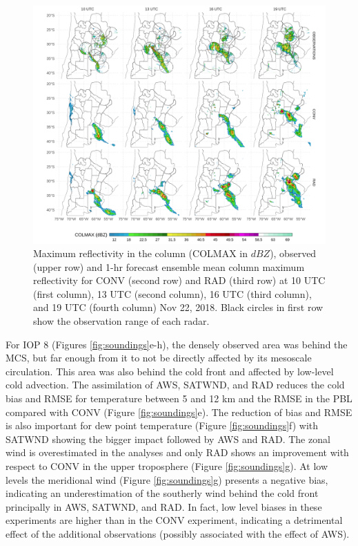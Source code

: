 \documentclass[final,5p,times,twocolumn,authoryear]{elsarticle} %
\begin{document}
\begin{figure}[h]
\includegraphics[width=1\linewidth]{../figures/dbz-mean-1} \caption{Maximum reflectivity in the column (COLMAX in \(dBZ\)), observed (upper row) and 1-hr forecast ensemble mean column maximum reflectivity for CONV (second row) and RAD (third row) at 10 UTC (first column), 13 UTC (second column), 16 UTC (third column), and 19 UTC (fourth column) Nov 22, 2018. Black circles in first row show the observation range of each radar.}\label{fig:dbz-mean}
\end{figure}

For IOP 8 (Figures \ref{fig:soundings}e-h), the densely observed area was behind the MCS, but far enough from it to not be directly affected by its mesoscale circulation. This area was also behind the cold front and affected by low-level cold advection. The assimilation of AWS, SATWND, and RAD reduces the cold bias and RMSE for temperature between 5 and 12 km and the RMSE in the PBL compared with CONV (Figure \ref{fig:soundings}e). The reduction of bias and RMSE is also important for dew point temperature (Figure \ref{fig:soundings}f) with SATWND showing the bigger impact followed by AWS and RAD. The zonal wind is overestimated in the analyses and only RAD shows an improvement with respect to CONV in the upper troposphere (Figure \ref{fig:soundings}g). At low levels the meridional wind (Figure \ref{fig:soundings}g) presents a negative bias, indicating an underestimation of the southerly wind behind the cold front principally in AWS, SATWND, and RAD. In fact, low level biases in these experiments are higher than in the CONV experiment, indicating a detrimental effect of the additional observations (possibly associated with the effect of AWS).
\end{document}
